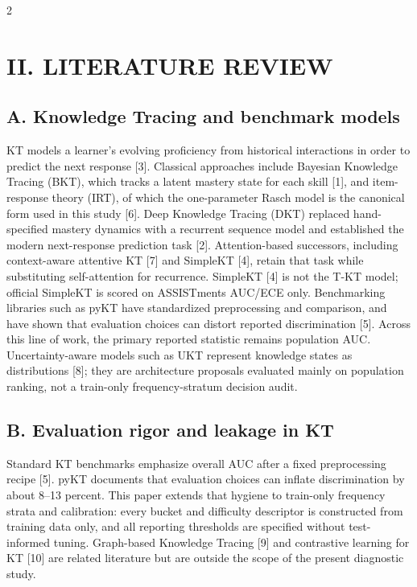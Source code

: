 \documentclass[10pt,a4paper]{article}
\begin{document}
\begin{multicols}{2}
\section*{\MakeUppercase{II. LITERATURE REVIEW}}

\subsection*{A. Knowledge Tracing and benchmark models}

 KT models a learner's evolving proficiency from historical interactions in order to predict the next response [3]. Classical approaches include Bayesian Knowledge Tracing (BKT), which tracks a latent mastery state for each skill [1], and item-response theory (IRT), of which the one-parameter Rasch model is the canonical form used in this study [6]. Deep Knowledge Tracing (DKT) replaced hand-specified mastery dynamics with a recurrent sequence model and established the modern next-response prediction task [2]. Attention-based successors, including context-aware attentive KT [7] and SimpleKT [4], retain that task while substituting self-attention for recurrence. SimpleKT [4] is not the T-KT model; official SimpleKT is scored on ASSISTments AUC/ECE only. Benchmarking libraries such as pyKT have standardized preprocessing and comparison, and have shown that evaluation choices can distort reported discrimination [5]. Across this line of work, the primary reported statistic remains population AUC. Uncertainty-aware models such as UKT represent knowledge states as distributions [8]; they are architecture proposals evaluated mainly on population ranking, not a train-only frequency-stratum decision audit.

\subsection*{B. Evaluation rigor and leakage in KT}

 Standard KT benchmarks emphasize overall AUC after a fixed preprocessing recipe [5]. pyKT documents that evaluation choices can inflate discrimination by about 8--13 percent. This paper extends that hygiene to train-only frequency strata and calibration: every bucket and difficulty descriptor is constructed from training data only, and all reporting thresholds are specified without test-informed tuning. Graph-based Knowledge Tracing [9] and contrastive learning for KT [10] are related literature but are outside the scope of the present diagnostic study.


\end{multicols}
\end{document}
